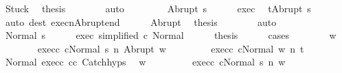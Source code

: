 \begin{isabellebody}
\ Stuck\ \isamarkupfalse%
\ {\isacharquery}thesis\isanewline
\ \ \ \ \ \ \isamarkupfalse%
\ auto\isanewline
\ \ \isamarkupfalse%
\isanewline
\ \ \ \ \isamarkupfalse%
\ {\isacharparenleft}Abrupt\ s{\isacharprime}{\isacharparenright}\isanewline
\ \ \ \ \isamarkupfalse%
\ exec\ \isamarkupfalse%
\ {\isachardoublequoteopen}t{\isacharequal}Abrupt\ s{\isacharprime}{\isachardoublequoteclose}\isanewline
\ \ \ \ \ \ \isamarkupfalse%
\ {\isacharparenleft}auto\ dest{\isacharcolon}\ execn{\isacharunderscore}Abrupt{\isacharunderscore}end{\isacharparenright}\isanewline
\ \ \ \ \isamarkupfalse%
\ Abrupt\ \isamarkupfalse%
\ {\isacharquery}thesis\isanewline
\ \ \ \ \ \ \isamarkupfalse%
\ auto\isanewline
\ \ \isamarkupfalse%
\isanewline
\ \ \ \ \isamarkupfalse%
\ {\isacharparenleft}Normal\ s{\isacharprime}{\isacharparenright}\isanewline
\ \ \ \ \isamarkupfalse%
\ exec\ {\isacharbrackleft}simplified\ c\ Normal{\isacharbrackright}\isanewline
\ \ \ \ \isamarkupfalse%
\ {\isacharquery}thesis\isanewline
\ \ \ \ \isamarkupfalse%
\ {\isacharparenleft}cases{\isacharparenright}\isanewline
\ \ \ \ \ \ \isamarkupfalse%
\ w\isanewline
\ \ \ \ \ \ \isamarkupfalse%
\ exec{\isacharunderscore}c{}{\isacharcolon}\ {\isachardoublequoteopen}{\isasymGamma}{\isasymturnstile}{\isasymlangle}c{}{\isacharcomma}Normal\ s{\isacharprime}{\isasymrangle}\ {\isacharequal}n{\isasymRightarrow}\ Abrupt\ w{\isachardoublequoteclose}\ \isanewline
\ \ \ \ \ \ \isamarkupfalse%
\ exec{\isacharunderscore}c{}{\isacharcolon}\ {\isachardoublequoteopen}{\isasymGamma}{\isasymturnstile}{\isasymlangle}c{}{\isacharcomma}Normal\ w{\isasymrangle}\ {\isacharequal}n{\isasymRightarrow}\ t{\isachardoublequoteclose}\isanewline
\ \ \ \ \ \ \isamarkupfalse%
\ Normal\ exec{\isacharunderscore}c{}\ c{}{\isacharunderscore}c{}{\isacharprime}\ Catch{\isachardot}hyps\ \isamarkupfalse%
\ w{\isacharprime}\ \isanewline
\ \ \ \ \ \ \ \ exec{\isacharunderscore}c{}{\isacharprime}{\isacharcolon}\ {\isachardoublequoteopen}{\isasymGamma}{\isasymturnstile}{\isasymlangle}c{}{\isacharprime}{\isacharcomma}Normal\ s{\isacharprime}{\isasymrangle}\ {\isacharequal}n{\isasymRightarrow}\ w{\isacharprime}{\isachardoublequoteclose}\ \isanewline

\end{isabellebody}
